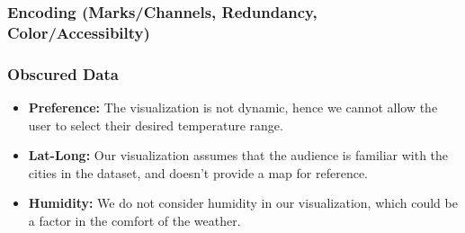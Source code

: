 \documentclass{article}
\begin{document}
\subsubsection{Encoding (Marks/Channels, Redundancy, Color/Accessibilty)}
\subsubsection{Obscured Data}
    \begin{itemize}
        \item \textbf{Preference:} The visualization is not dynamic, hence we cannot allow the user to select their desired temperature range.
        \item \textbf{Lat-Long:} Our visualization assumes that the audience is familiar with the cities in the dataset, and doesn't provide a map for reference.
        \item \textbf{Humidity:} We do not consider humidity in our visualization, which could be a factor in the comfort of the weather.
    \end{itemize}



\end{document}
